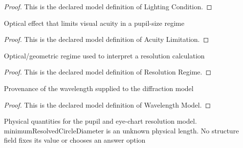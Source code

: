 \begin{proof}
  This is the declared model definition of Lighting Condition.
\end{proof}
\begin{definition}
  \label{def:physics:phyx-mini-0075:phyxminiproblems-problemphyxmini0075-acuitylimitation}
  Optical effect that limits visual acuity in a pupil-size regime
\end{definition}
\begin{proof}
  This is the declared model definition of Acuity Limitation.
\end{proof}
\begin{definition}
  \label{def:physics:phyx-mini-0075:phyxminiproblems-problemphyxmini0075-resolutionregime}
  Optical/geometric regime used to interpret a resolution calculation
\end{definition}
\begin{proof}
  This is the declared model definition of Resolution Regime.
\end{proof}
\begin{definition}
  \label{def:physics:phyx-mini-0075:phyxminiproblems-problemphyxmini0075-wavelengthmodel}
  Provenance of the wavelength supplied to the diffraction model
\end{definition}
\begin{proof}
  This is the declared model definition of Wavelength Model.
\end{proof}
\begin{definition}
  \label{def:physics:phyx-mini-0075:phyxminiproblems-problemphyxmini0075-eyechartresolutionsetup}
  Physical quantities for the pupil and eye-chart resolution model. minimumResolvedCircleDiameter is an unknown physical length. No structure field fixes its value or chooses an answer option
\end{definition}
